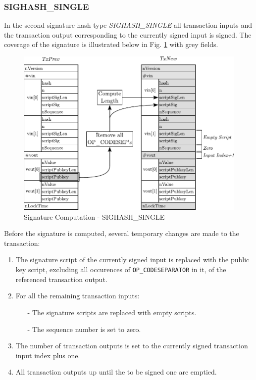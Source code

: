 \clearpage
\subsubsection*{SIGHASH\_SINGLE}
In the second signature hash type \emph{SIGHASH\_SINGLE} all transaction inputs and the transaction output corresponding to the currently signed input is signed. The coverage of the signature is illustrated below in Fig. \ref{fig:SigHash-Single} with grey fields.

\begin{figure}[ht!]
 \centering
 \includegraphics[scale=0.9]{images/SIGHASH_SINGLE.pdf}
 \caption{Signature Computation - SIGHASH\_SINGLE} \label{fig:SigHash-Single}
\end{figure}

\noindent
Before the signature is computed, several temporary changes are made to the transaction:
\begin{enumerate}[label=\alph*), leftmargin=1cm]
\item The signature script of the currently signed input is replaced with the public key script, excluding all occurences of \texttt{OP\_CODESEPARATOR} in it, of the referenced transaction output.
\item For all the remaining transaction inputs:\vspace{5pt}
\begin{itemize}
\item[-] The signature scripts are replaced with empty scripts.
\item[-] The sequence number is set to zero.
\end{itemize}
\item The number of transaction outputs is set to the currently signed transaction input index plus one.
\item All transaction outputs up until the to be signed one are emptied.
\end{enumerate}


